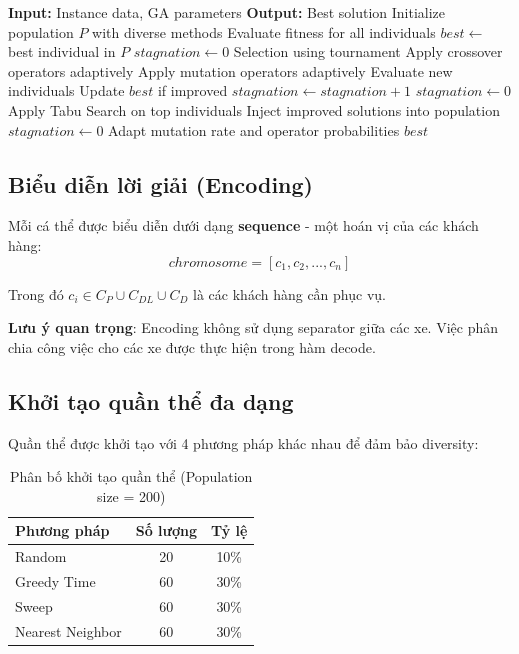 \documentclass[12pt,a4paper]{article}
\begin{document}
\begin{algorithm}[H]
\caption{GA + Tabu Search cho PDP-DR}
\begin{algorithmic}[1]
\STATE \textbf{Input:} Instance data, GA parameters
\STATE \textbf{Output:} Best solution
\STATE
\STATE Initialize population $P$ with diverse methods
\STATE Evaluate fitness for all individuals
\STATE $best \leftarrow$ best individual in $P$
\STATE $stagnation \leftarrow 0$
\STATE
{}
    \STATE Selection using tournament
    \STATE Apply crossover operators adaptively
    \STATE Apply mutation operators adaptively
    \STATE Evaluate new individuals
    \STATE Update $best$ if improved
    \STATE
        \STATE $stagnation \leftarrow stagnation + 1$
    \ELSE
        \STATE $stagnation \leftarrow 0$
    \ENDIF
    \STATE
        \STATE Apply Tabu Search on top individuals
        \STATE Inject improved solutions into population
        \STATE $stagnation \leftarrow 0$
    \ENDIF
    \STATE
    \STATE Adapt mutation rate and operator probabilities
\ENDFOR
\STATE
\RETURN $best$
\end{algorithmic}
\end{algorithm}

\subsection{Biểu diễn lời giải (Encoding)}

Mỗi cá thể được biểu diễn dưới dạng \textbf{sequence} - một hoán vị của các khách hàng:
\begin{equation}
    chromosome = [c_1, c_2, ..., c_n]
\end{equation}

Trong đó $c_i \in C_P \cup C_{DL} \cup C_D$ là các khách hàng cần phục vụ.

\textbf{Lưu ý quan trọng}: Encoding không sử dụng separator giữa các xe. Việc phân chia công việc cho các xe được thực hiện trong hàm decode.

\subsection{Khởi tạo quần thể đa dạng}

Quần thể được khởi tạo với 4 phương pháp khác nhau để đảm bảo diversity:

\begin{table}[H]
\centering
\caption{Phân bố khởi tạo quần thể (Population size = 200)}
\begin{tabular}{lcc}
\toprule
\textbf{Phương pháp} & \textbf{Số lượng} & \textbf{Tỷ lệ} \\
\midrule
Random & 20 & 10\% \\
Greedy Time & 60 & 30\% \\
Sweep & 60 & 30\% \\
Nearest Neighbor & 60 & 30\% \\
\bottomrule
\end{tabular}
\end{table}
\end{document}
